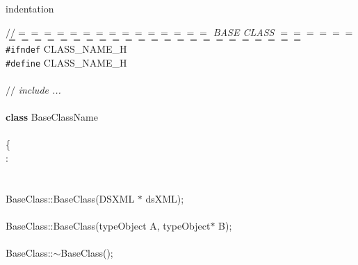 %
%
\expandafter\ifx\csname indentation\endcsname\relax%
\newlength{\indentation}\fi
\setlength{\indentation}{0.5em}
\begin{flushleft}
{$//$\it{}$=$$=$$=$$=$$=$$=$$=$$=$$=$$=$$=$$=$$=$$=$$=$ BASE CLASS $=$$=$$=$$=$$=$$=$$=$$=$$=$$=$$=$$=$$=$$=$$=$$=$$=$$=$$=$$=$$=$$=$$=$$=$$=$$=$$=$$=$$=${}\mbox{}\\
}{\tt \#ifndef} CLASS\_NAME\_H\mbox{}\\
{\tt \#define} CLASS\_NAME\_H\mbox{}\\
\mbox{}\\
{$//$\it{} include ...{}\mbox{}\\
}\mbox{}\\
{\bf class} BaseClassName\mbox{}\\
\mbox{}\\
\{\mbox{}\\
\hspace*{1\indentation}{\bf public}:\mbox{}\\
\hspace*{2\indentation}\mbox{}\\
\hspace*{2\indentation}\mbox{}\\
\hspace*{2\indentation}BaseClass::BaseClass(DSXML $\ast$ dsXML);\mbox{}\\
\hspace*{2\indentation}\mbox{}\\
\hspace*{2\indentation}BaseClass::BaseClass(typeObject A, typeObject$\ast$ B);\mbox{}\\
\mbox{}\\
\hspace*{2\indentation}{\bf virtual} BaseClass::$\sim$BaseClass();\mbox{}\\
\mbox{}\\

\end{flushleft}
